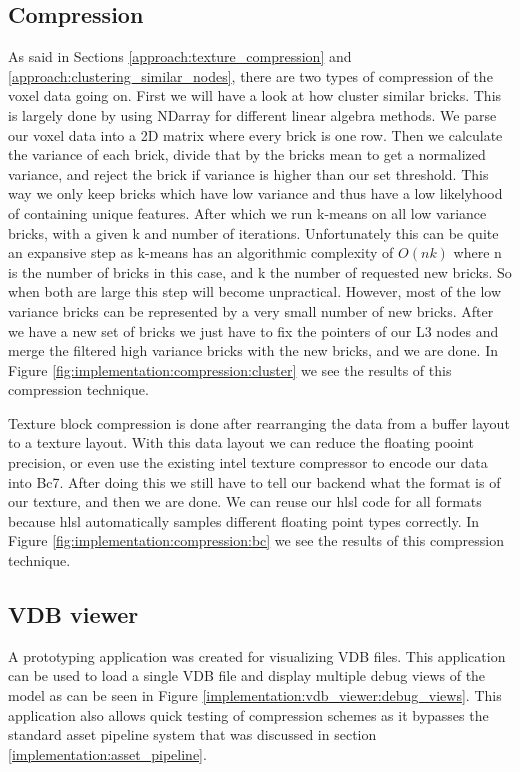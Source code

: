 \subsection{Compression} \label{implementation:compression}
As said in Sections \ref{approach:texture_compression} and \ref{approach:clustering_similar_nodes}, there are two types of compression of the voxel data going on. First we will have a look at how cluster similar bricks. This is largely done by using NDarray \cite{NDarray} for different linear algebra methods. We parse our voxel data into a 2D matrix where every brick is one row. Then we calculate the variance of each brick, divide that by the bricks mean to get a normalized variance, and reject the brick if variance is higher than our set threshold. This way we only keep bricks which have low variance and thus have a low likelyhood of containing unique features. After which we run k-means on all low variance bricks, with a given k and number of iterations. Unfortunately this can be quite an expansive step as k-means has an algorithmic complexity of $O(nk)$ where n is the number of bricks in this case, and k the number of requested new bricks. So when both are large this step will become unpractical. However, most of the low variance bricks can be represented by a very small number of new bricks. After we have a new set of bricks we just have to fix the pointers of our L3 nodes and merge the filtered high variance bricks with the new bricks, and we are done. In Figure \ref{fig:implementation:compression:cluster} we see the results of this compression technique.


Texture block compression is done after rearranging the data from a buffer layout to a texture layout. With this data layout we can reduce the floating pooint precision, or even use the existing intel texture compressor \cite{ISPCTextureCompressor} to encode our data into Bc7. After doing this we still have to tell our backend what the format is of our texture, and then we are done. We can reuse our hlsl code for all formats because hlsl automatically samples different floating point types correctly.  In Figure \ref{fig:implementation:compression:bc} we see the results of this compression technique.




\subsection{VDB viewer} \label{implementation:vdb_viewer}
A prototyping application was created for visualizing VDB files. This application can be used to load a single VDB file and display multiple debug views of the model as can be seen in Figure \ref{implementation:vdb_viewer:debug_views}. This application also allows quick testing of compression schemes as it bypasses the standard asset pipeline system that was discussed in section \ref{implementation:asset_pipeline}.

